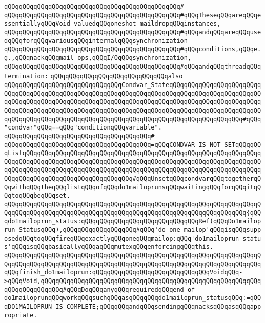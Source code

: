 \verb|qQQqqQQqqQQqqQQqqQQqqQQqqQQqqQQqqQQqqQQqqQQqqQQq#|\newline
\verb|qQQqqQQqqQQqqQQqqQQqqQQqqQQqqQQqqQQqqQQqqQQqqQQq#qQQqTheseqQQqareqQQqessentiallyqQQqVoid-valuedqQQqoneshot_maildropqQQqinstances,|\newline
\verb|qQQqqQQqqQQqqQQqqQQqqQQqqQQqqQQqqQQqqQQqqQQqqQQq#qQQqandqQQqareqQQqusedqQQqforqQQqvariousqQQqinternalqQQqsynchronization|\newline
\verb|qQQqqQQqqQQqqQQqqQQqqQQqqQQqqQQqqQQqqQQqqQQqqQQq#qQQqconditions,qQQqe.g.,qQQqnackqQQqmail_ops,qQQqI/OqQQqsynchronization,|\newline
\verb|qQQqqQQqqQQqqQQqqQQqqQQqqQQqqQQqqQQqqQQqqQQqqQQq#qQQqandqQQqthreadqQQqtermination:|\newline
\newline
\verb|qQQqqQQqqQQqqQQqqQQqqQQqqQQqqQQqalso|\newline
\verb|qQQqqQQqqQQqqQQqqQQqqQQqqQQqqQQqCondvar_StateqQQqqQQqqQQqqQQqqQQqqQQqqQQqqQQqqQQqqQQqqQQqqQQqqQQqqQQqqQQqqQQqqQQqqQQqqQQqqQQqqQQqqQQqqQQqqQQqqQQqqQQqqQQqqQQqqQQqqQQqqQQqqQQqqQQqqQQqqQQqqQQqqQQqqQQqqQQqqQQqqQQqqQQqqQQqqQQqqQQqqQQqqQQqqQQqqQQqqQQqqQQqqQQqqQQqqQQqqQQqqQQqqQQqqQQqqQQqqQQqqQQqqQQqqQQqqQQqqQQqqQQqqQQqqQQqqQQqqQQqqQQqqQQqqQQqqQQqqQQq#qQQq"condvar"qQQq==qQQq"conditionqQQqvariable".|\newline
\verb|qQQqqQQqqQQqqQQqqQQqqQQqqQQqqQQqqQQqqQQq#|\newline
\verb|qQQqqQQqqQQqqQQqqQQqqQQqqQQqqQQqqQQqqQQq=qQQqCONDVAR_IS_NOT_SETqQQqqQQqListqQQqqQQqqQQqqQQqqQQqqQQqqQQqqQQqqQQqqQQqqQQqqQQqqQQqqQQqqQQqqQQqqQQqqQQqqQQqqQQqqQQqqQQqqQQqqQQqqQQqqQQqqQQqqQQqqQQqqQQqqQQqqQQqqQQqqQQqqQQqqQQqqQQqqQQqqQQqqQQqqQQqqQQqqQQqqQQqqQQqqQQqqQQqqQQqqQQqqQQqqQQqqQQqqQQqqQQqqQQqqQQqqQQqqQQqqQQqqQQq#qQQqUnsetqQQqcondvarqQQqtogetherqQQqwithqQQqtheqQQqlistqQQqofqQQqdo1mailoprunsqQQqwaitingqQQqforqQQqitqQQqtoqQQqbeqQQqset.|\newline
\verb|qQQqqQQqqQQqqQQqqQQqqQQqqQQqqQQqqQQqqQQqqQQqqQQqqQQqqQQqqQQqqQQqqQQqqQQqqQQqqQQqqQQqqQQqqQQqqQQqqQQqqQQqqQQqqQQqqQQqqQQqqQQqqQQqqQQqqQQq{qQQqdo1mailoprun_status:qQQqqQQqqQQqqQQqqQQqqQQqqQQqqQQqRef(qQQqDo1mailoprun_StatusqQQq),qQQqqQQqqQQqqQQqqQQq#qQQq'do_one_mailop'qQQqisqQQqsupposedqQQqtoqQQqfireqQQqexactlyqQQqoneqQQqmailop:qQQq'do1mailoprun_status'qQQqisqQQqbasicallyqQQqaqQQqmutexqQQqenforcingqQQqthis.|\newline
\verb|qQQqqQQqqQQqqQQqqQQqqQQqqQQqqQQqqQQqqQQqqQQqqQQqqQQqqQQqqQQqqQQqqQQqqQQqqQQqqQQqqQQqqQQqqQQqqQQqqQQqqQQqqQQqqQQqqQQqqQQqqQQqqQQqqQQqqQQqqQQqqQQqfinish_do1mailoprun:qQQqqQQqqQQqqQQqqQQqqQQqqQQqqQQqVoidqQQq->qQQqVoid,qQQqqQQqqQQqqQQqqQQqqQQqqQQqqQQqqQQqqQQqqQQqqQQqqQQqqQQqqQQqqQQqqQQqqQQqqQQq#qQQqDoqQQqanyqQQqrequiredqQQqend-of-do1mailoprunqQQqworkqQQqsuchqQQqasqQQqqQQqdo1mailoprun_statusqQQq:=qQQqDO1MAILOPRUN_IS_COMPLETE;qQQqqQQqandqQQqsendingqQQqnacksqQQqasqQQqappropriate.|\newline
